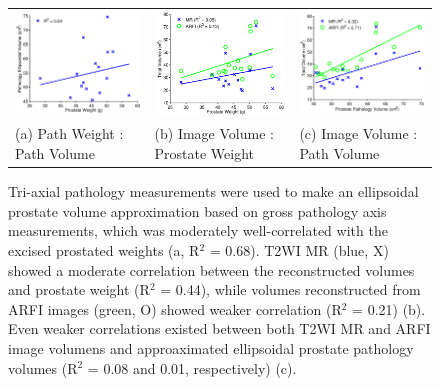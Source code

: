 \begin{figure}[htb!]
\centering
\begin{tabular}{lll}
\includegraphics[width=0.3\linewidth]{figs/corr_path_vol_weight_vol} &
\includegraphics[width=0.3\linewidth]{figs/corr_weight_vol} &
\includegraphics[width=0.3\linewidth]{figs/corr_pathVol_vol} \\
(a) Path Weight : Path Volume & (b) Image Volume : Prostate Weight & (c) Image Volume : Path Volume \\
\end{tabular}
\caption{Tri-axial pathology measurements were used to make an ellipsoidal
    prostate volume approximation based on gross pathology axis measurements,
    which was moderately well-correlated with the excised prostated weights (a,
    R$^2$ = 0.68).  T2WI MR (blue, X) showed a moderate correlation between the
    reconstructed volumes and prostate weight (R$^2$ = 0.44), while volumes
    reconstructed from ARFI images (green, O) showed weaker correlation (R$^2$
    = 0.21) (b).  Even weaker correlations existed between both T2WI MR and
    ARFI image volumens and approaximated ellipsoidal prostate pathology
    volumes (R$^2$ = 0.08 and 0.01, respectively) (c).}
\label{fig:mr_arfi_weight}
\end{figure}
